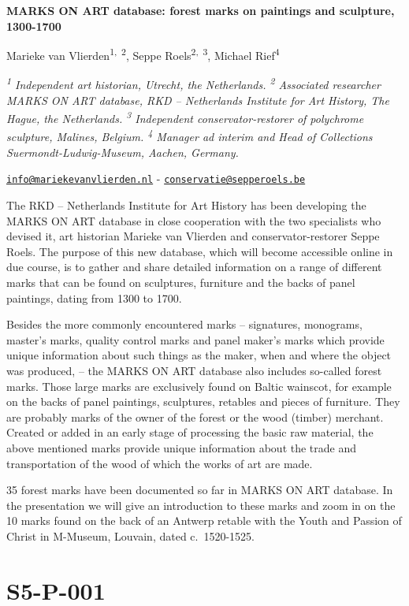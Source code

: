 \documentclass[
]{book}
\begin{document}
\textbf{MARKS ON ART database: forest marks on paintings and sculpture, 1300-1700}

Marieke van Vlierden\textsuperscript{1,~2}, Seppe Roels\textsuperscript{2,~3}, Michael Rief\textsuperscript{4}

\emph{\textsuperscript{1} Independent art historian, Utrecht, the Netherlands. \textsuperscript{2} Associated researcher MARKS ON ART database, RKD -- Netherlands Institute for Art History, The Hague, the Netherlands. \textsuperscript{3} Independent conservator-restorer of polychrome sculpture, Malines, Belgium. \textsuperscript{4} Manager ad interim and Head of Collections Suermondt-Ludwig-Museum, Aachen, Germany.}

\href{mailto:info@mariekevanvlierden.nl}{\nolinkurl{info@mariekevanvlierden.nl}} - \href{mailto:conservatie@sepperoels.be}{\nolinkurl{conservatie@sepperoels.be}}

The RKD -- Netherlands Institute for Art History has been developing the MARKS ON ART database in close cooperation with the two specialists who devised it, art historian Marieke van Vlierden and conservator-restorer Seppe Roels. The purpose of this new database, which will become accessible online in due course, is to gather and share detailed information on a range of different marks that can be found on sculptures, furniture and the backs of panel paintings, dating from 1300 to 1700.

Besides the more commonly encountered marks -- signatures, monograms, master's marks, quality control marks and panel maker's marks which provide unique information about such things as the maker, when and where the object was produced, -- the MARKS ON ART database also includes so-called forest marks. Those large marks are exclusively found on Baltic wainscot, for example on the backs of panel paintings, sculptures, retables and pieces of furniture. They are probably marks of the owner of the forest or the wood (timber) merchant. Created or added in an early stage of processing the basic raw material, the above mentioned marks provide unique information about the trade and transportation of the wood of which the works of art are made.

35 forest marks have been documented so far in MARKS ON ART database. In the presentation we will give an introduction to these marks and zoom in on the 10 marks found on the back of an Antwerp retable with the Youth and Passion of Christ in M-Museum, Louvain, dated c.~1520-1525.

\hypertarget{s5-p-001}{%
\section*{S5-P-001}\label{s5-p-001}}
\end{document}

